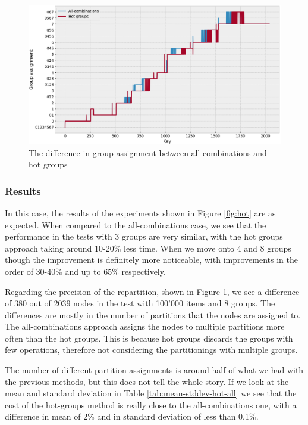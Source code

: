 \begin{figure}[!htb]
  \centering
  \includegraphics[width=\textwidth,height=\textheight,keepaspectratio]{img/partition_difference_hot_all.png}
  \caption{The difference in group assignment between all-combinations and hot groups}
  \label{fig:hot-partitioning}
\end{figure}

\subsubsection{Results}
In this case, the results of the experiments shown in Figure \ref{fig:hot} are as expected. When compared to the all-combinations case, we see that the performance in the tests with 3 groups are very similar, with the hot groups approach taking around 10-20\% less time. When we move onto 4 and 8 groups though the improvement is definitely more noticeable, with improvements in the order of 30-40\% and up to 65\% respectively.

Regarding the precision of the repartition, shown in Figure \ref{fig:hot-partitioning}, we see a difference of 380 out of 2039 nodes in the test with 100'000 items and 8 groups.
The differences are mostly in the number of partitions that the nodes are assigned to. The all-combinations approach assigns the nodes to multiple partitions more often than the hot groups. This is because hot groups discards the groups with few operations, therefore not considering the partitionings with multiple groups.

The number of different partition assignments is around half of what we had with the previous methods, but this does not tell the whole story. If we look at the mean and standard deviation in Table \ref{tab:mean-stddev-hot-all} we see that the cost of the hot-groups method is really close to the all-combinations one, with a difference in mean of 2\% and in standard deviation of less than 0.1\%.

